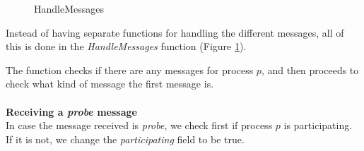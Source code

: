 \documentclass{report}
\begin{document}
\begin{figure}
%
\@xx{}%
%
%
\@xx{}%

\@x{}\bottombar\@xx{}%

  \caption{HandleMessages}
  \label{ringhandlemessages}
  \end{figure}

Instead of having separate functions for handling the different messages, all of this is done in the \textit{HandleMessages} function (Figure \ref{ringhandlemessages}).

The function checks if there are any messages for process $p$, and then proceeds to check what kind of message the first message is.
\\\\
\noindent
\textbf{Receiving a \textit{probe} message}\\
\noindent
In case the message received is \textit{probe}, we check first if process $p$ is participating. If it is not, we change the \textit{participating} field to be true.
\end{document}
